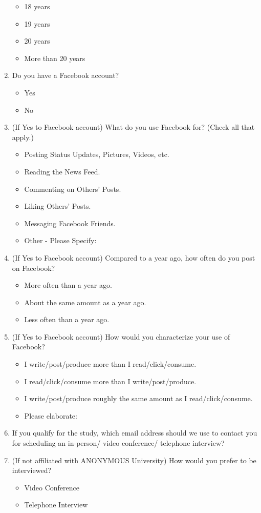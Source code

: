 \begin{enumerate}
\begin{itemize}
\item 18 years
\item 19 years
\item 20 years
\item More than 20 years
\end{itemize}
\item Do you have a Facebook account?
\begin{itemize}
\item Yes
\item No
\end{itemize}
\item (If Yes to Facebook account) What do you use Facebook for? (Check all that apply.)
\begin{itemize}
\item Posting Status Updates, Pictures, Videos, etc.
\item Reading the News Feed.
\item Commenting on Others' Posts.
\item Liking Others' Posts.
\item Messaging Facebook Friends.
\item Other - Please Specify:
\end{itemize}

\item (If Yes to Facebook account) Compared to a year ago, how often do you post on Facebook?
\begin{itemize}
\item More often than a year ago.
\item About the same amount as a year ago.
\item Less often than a year ago.
\end{itemize}
\item (If Yes to Facebook account) How would you characterize your use of Facebook?
\begin{itemize}
\item I write/post/produce more than I read/click/consume.
\item I read/click/consume more than I write/post/produce.
\item I write/post/produce roughly the same amount as I read/click/consume.
\item Please elaborate:
\end{itemize}
\item If you qualify for the study, which email address should we use to contact you for scheduling an in-person/ video conference/ telephone interview?
\item (If not affiliated with ANONYMOUS University) How would you prefer to be interviewed?
\begin{itemize}
\item Video Conference
\item Telephone Interview
\end{itemize}
\end{enumerate}
